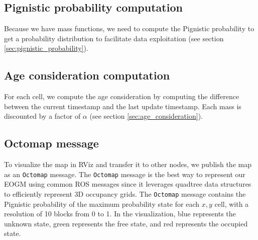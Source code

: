 \subsection{Pignistic probability computation}

Because we have mass functions, we need to compute the Pignistic probability to get a probability distribution to facilitate data exploitation (see section \ref{sec:pignistic_probability}).

\subsection{Age consideration computation}

For each cell, we compute the age consideration by computing the difference between the current timestamp and the last update timestamp.
Each mass is discounted by a factor of $\alpha$ (see section \ref{sec:age_consideration}).

\subsection{Octomap message}

To visualize the map in RViz and transfer it to other nodes, we publish the map as an \texttt{Octomap} message.
The \texttt{Octomap} message is the best way to represent our EOGM using common ROS messages since it leverages quadtree data structures to efficiently represent 3D occupancy grids.
The \texttt{Octomap} message contains the Pignistic probability of the maximum probability state for each $x,y$ cell, with a resolution of 10 blocks from 0 to 1.
In the visualization, blue represents the unknown state, green represents the free state, and red represents the occupied state.